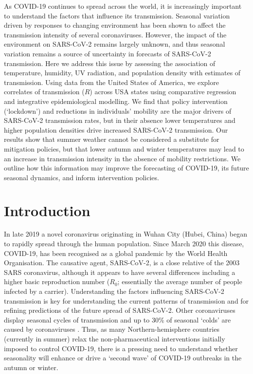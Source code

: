 \documentclass[12pt,english,a4paper]{article}
\newcommand{\virus}{SARS-CoV-2\xspace}
\newcommand{\disease}{COVID-19\xspace}
\newcommand{\RO}{$R_0$\xspace}
\begin{document}
As \disease continues to spread across the world, it is increasingly important to understand the factors that influence its transmission. Seasonal variation driven by responses to changing environment has been shown to affect the transmission intensity of several coronaviruses.
However, the impact of the environment on \virus remains largely unknown, and thus seasonal variation remains a source of uncertainty in forecasts of \virus transmission. Here we address this issue by  assessing the association of temperature, humidity, UV radiation, and population density with estimates of transmission. Using data from the United States of America, we explore correlates of transmission ($R$) across USA states using comparative regression and integrative epidemiological modelling.
We find that policy intervention (`lockdown') and reductions in individuals' mobility are the major drivers of \virus transmission rates, but in their absence lower temperatures and higher population densities drive increased \virus transmission. Our results show that summer weather cannot be considered a substitute for mitigation policies, but that lower autumn and winter temperatures may lead to an increase in transmission intensity in the absence of mobility restrictions.
We outline how this information may improve the forecasting of \disease, its future seasonal dynamics, and inform intervention policies.


\clearpage
\section*{Introduction}


In late 2019 a novel coronavirus originating in 
Wuhan City (Hubei, China)\cite{Zhou2020} began to rapidly spread through the human population. Since March 2020 this disease, \disease, has been recognised as a global pandemic by the World Health Organisation\cite{WHO2020}. 
The causative agent, SARS-CoV-2, is a close relative of the 2003 SARS coronavirus\cite{Zhou2020}, although it appears to have several differences including a higher basic reproduction number\cite{Liu2020} (\RO; essentially the average number of people infected by a carrier). Understanding the factors influencing \virus transmission is key for understanding the current patterns of transmission and for refining predictions of the future spread of \virus. Other coronaviruses display seasonal cycles of transmission and up to 30\% of seasonal `colds' are caused by coronaviruses \cite{Mesel-Lemoine2012}.
Thus, as many Northern-hemisphere countries (currently in summer) relax the non-pharmaceutical interventions initially imposed to control \disease, there is a pressing need to understand whether seasonality will enhance or drive a `second wave' of \disease outbreaks in the autumn or winter\cite{Smit2020}.
\end{document}
